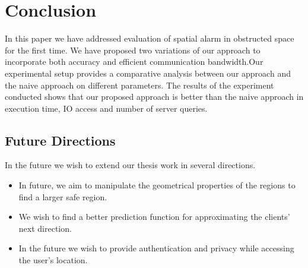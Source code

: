 \chapter{Conclusion}
\label{chp:conclusion}
In this paper we have addressed evaluation of spatial alarm in obstructed space for the first time. 
We have proposed two variations of our approach to incorporate both accuracy and efficient communication bandwidth.Our experimental setup provides a comparative analysis between our approach and the naive approach on different parameters. The results of the experiment conducted shows that our proposed approach is better than the naive approach in execution time, IO access and number of server queries. 


\section{Future Directions}
In the future we wish to extend our thesis work in several directions. 

\begin{itemize}
    \item In future, we aim to manipulate the geometrical properties of the regions to find a larger safe region.
    \item We wish to find a better prediction function for approximating the clients' next direction. 
    \item In the future we wish to provide authentication and privacy while accessing the user's location.


\end{itemize}


\endinput
